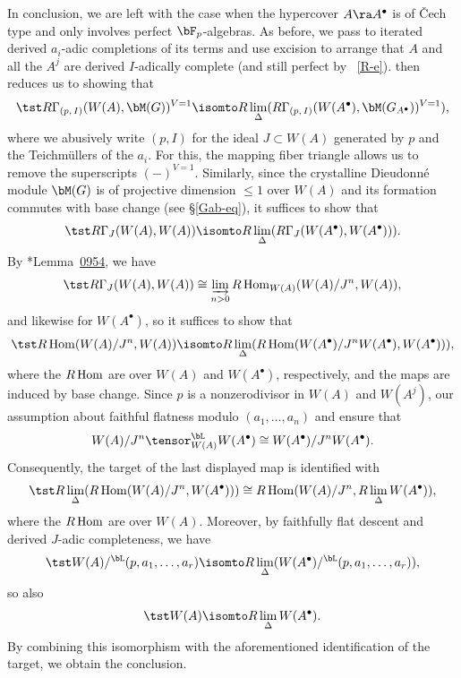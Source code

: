 In conclusion, we are left with the case when the hypercover $A \ra A^\bullet$ is of \v{C}ech type and only involves perfect $\bF_p$-algebras. As before, we pass to iterated derived $a_i$-adic completions of its terms and use excision  to arrange that $A$ and all the $A^j$ are derived $I$-adically complete (and still perfect by ~\ref{R-e}). %
 then reduces us to showing that
\[
\tst R\Gamma_{(p,\, I)}(W(A), \bM(G))^{V = 1} \isomto R\lim_{\Delta} (R\Gamma_{(p,\, I)}(W(A^\bullet), \bM(G_{A^\bullet}))^{V = 1}),
\]
where we abusively write $(p, I)$ for the ideal $J \subset W(A)$ generated by $p$ and the Teichm\"{u}llers of the $a_i$. For this, the mapping fiber triangle allows us to remove the superscripts $(-)^{V = 1}$. Similarly, since the crystalline Dieudonn\'{e} module $\bM(G)$ is of projective dimension $\le 1$ over $W(A)$ and its formation commutes with base change (see \S\ref{Gab-eq}), it suffices to show that
\[
\tst R\Gamma_{J}(W(A), W(A)) \isomto R\lim_{\Delta} (R\Gamma_{J}(W(A^\bullet), W(A^\bullet))).
\]
By \cite{SP}*{Lemma~\href{https://stacks.math.columbia.edu/tag/0954}{0954}}, we have
\[
\tst R\Gamma_{J}(W(A), W(A)) \cong \varinjlim_{n > 0} R\Hom_{W(A)}(W(A)/J^n, W(A)),
\]
and likewise for $W(A^\bullet)$, so it suffices to show that
\[
\tst R\Hom(W(A)/J^n, W(A)) \isomto R\lim_{\Delta}(R\Hom(W(A^\bullet)/J^nW(A^\bullet), W(A^\bullet))),
\]
where the $R\operatorname{Hom}$ are over $W(A)$ and $W(A^\bullet)$, respectively, and the maps are induced by base change. Since $p$ is a nonzerodivisor in $W(A)$ and $W(A^j)$, our assumption about faithful flatness modulo $(a_1, \dotsc, a_n)$ and  ensure that
\[
W(A)/J^n \tensor^\bL_{W(A)} W(A^\bullet) \cong W(A^\bullet)/J^nW(A^\bullet).
\]
Consequently, the target of the last displayed map is identified with
\[
\tst %
R\lim_{\Delta}(R\Hom(W(A)/J^n, W(A^\bullet))) \cong R\Hom(W(A)/J^n, R\lim_{\Delta}W(A^\bullet)),
\]
where the $R\operatorname{Hom}$ are over $W(A)$. Moreover, by faithfully flat descent and derived $J$-adic completeness, we have
\[
\tst W(A)/^\bL(p, a_1, \dotsc, a_r) \isomto R\lim_{\Delta}(W(A^\bullet)/^\bL(p, a_1, \dotsc, a_r)),
\]
so also
\[
\tst W(A) \isomto R\lim_{\Delta} W(A^\bullet).
\]
By combining this isomorphism with the aforementioned identification of the target, we obtain the conclusion.
\epf










%


%


